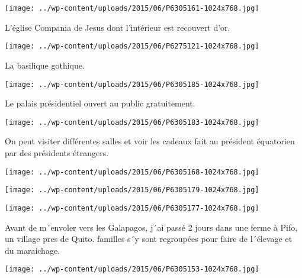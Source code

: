  \newline
\centerline{\texttt{[image: ../wp-content/uploads/2015/06/P6305161-1024x768.jpg]} } 
 \newline
 L'église Compania de Jesus dont l'intérieur est recouvert d'or. \newline
 \newline
\centerline{\texttt{[image: ../wp-content/uploads/2015/06/P6275121-1024x768.jpg]} } 
 \newline
 La basilique gothique. \newline
 \newline
\centerline{\texttt{[image: ../wp-content/uploads/2015/06/P6305185-1024x768.jpg]} } 
 \newline
 Le palais présidentiel ouvert au public gratuitement. \newline
 \newline
\centerline{\texttt{[image: ../wp-content/uploads/2015/06/P6305183-1024x768.jpg]} } 
 \newline
 On peut visiter différentes salles et voir les cadeaux fait au président équatorien par des présidents étrangers. \newline
 \newline
\centerline{\texttt{[image: ../wp-content/uploads/2015/06/P6305168-1024x768.jpg]} } 
 \newline
 \newline
\centerline{\texttt{[image: ../wp-content/uploads/2015/06/P6305179-1024x768.jpg]} } 
 \newline
 \newline
\centerline{\texttt{[image: ../wp-content/uploads/2015/06/P6305177-1024x768.jpg]} } 
 \newline
 Avant de m´envoler vers les Galapagos, j´ai passé 2 jours dans une ferme à Pifo, un village pres de Quito.  familles s´y sont regroupées pour faire de l´élevage et du maraichage. \newline
 \newline
\centerline{\texttt{[image: ../wp-content/uploads/2015/06/P6305153-1024x768.jpg]} } 
 \newline

\newpage
 
